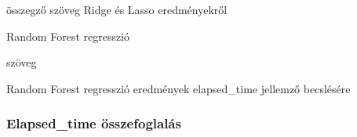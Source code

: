 összegző szöveg Ridge és Lasso eredményekről

Random Forest regresszió


szöveg
\begin{table}[!h]
	\centering
	
	\caption{Random Forest regresszió eredmények elapsed\_time jellemző becslésére}
\end{table}



\subsubsection{Elapsed\_time összefoglalás}
